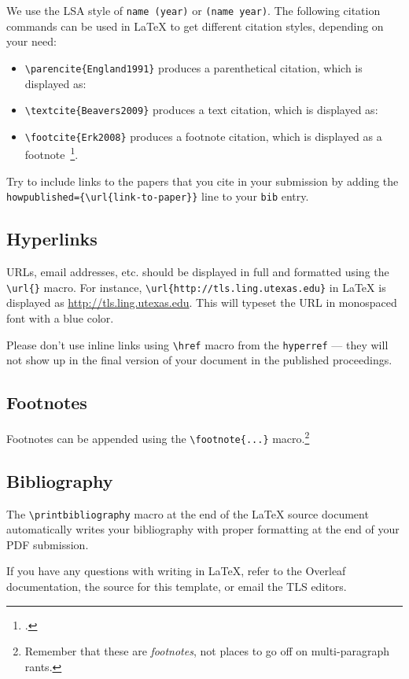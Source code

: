 \documentclass[11pt]{article}
\begin{document}
We use the LSA style of \texttt{name (year)} or \texttt{(name year)}. The following citation commands can be used in \LaTeX{} to get different citation styles, depending on your need:

\begin{itemize}
    \item \verb|\parencite{England1991}| produces a parenthetical citation, which is displayed as: \parencite{England1991}
    \item \verb|\textcite{Beavers2009}| produces a text citation, which is displayed as: \textcite{Beavers2009}
    \item \verb|\footcite{Erk2008}| produces a footnote citation, which is displayed as a footnote~\footcite{Erk2008}.
\end{itemize}

Try to include links to the papers that you cite in your submission by adding the \verb|howpublished={\url{link-to-paper}}| line to your \texttt{bib} entry.

\subsection{Hyperlinks}

URLs, email addresses, etc. should be displayed in full and formatted using the \verb|\url{}| macro. For instance, \verb|\url{http://tls.ling.utexas.edu}| in \LaTeX{} is displayed as \url{http://tls.ling.utexas.edu}. This will typeset the URL in monospaced font with a blue color.

Please don't use inline links using \verb|\href| macro from the \verb|hyperref| --- they will not show up in the final version of your document in the published proceedings.

\subsection{Footnotes}

Footnotes can be appended using the \verb|\footnote{...}| macro.\footnote{Remember that these are \emph{footnotes}, not places to go off on multi-paragraph rants.}

\subsection{Bibliography}

The \verb|\printbibliography| macro at the end of the \LaTeX{} source document automatically writes your bibliography with proper formatting at the end of your PDF submission.

If you have any questions with writing in \LaTeX{}, refer to the Overleaf documentation, the source for this template, or email the TLS editors.

\printbibliography
\end{document}
